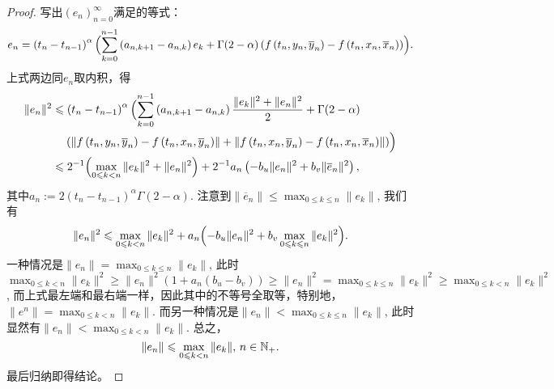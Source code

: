 \begin{proof}
    写出$\left(e_n\right)_{n=0}^\infty$满足的等式：
    \begin{equation*}
        e_n=\left(t_n-t_{n-1}\right)^\alpha\Bigl(\sum_{k=0}^{n-1}\left(a_{n,k+1}-a_{n,k}\right)e_k+\Gamma(2-\alpha)\left(f\left(t_n,y_n,\overline y_n\right)-f\left(t_n,x_n,\overline x_n\right)\right)\Bigr).
    \end{equation*}
    上式两边同$e_n$取内积，得
    \begin{align*}
        \|e_n\|^2&\leqslant\left(t_n-t_{n-1}\right)^\alpha\Bigl(\sum_{k=0}^{n-1}\left(a_{n,k+1}-a_{n,k}\right)\frac{\|e_k\|^2+\|e_n\|^2}{2} +\Gamma(2-\alpha)
        \\& \relphantom{=}\left(\left\|f\left(t_n,y_n,\overline y_n\right)-f\left(t_n,x_n,\overline y_n\right)\right\|+\left\|f\left(t_n,x_n,\overline y_n\right)-f\left(t_n,x_n,\overline x_n\right)\right\|\right)\Bigr)
        \\&\leqslant 2^{-1}\Bigl(\max_{0\leqslant k<n} \|e_k\|^2 + \|e_n\|^2\Bigr)
        +2^{-1}a_n\left(-b_u \|e_n\|^2+b_v \|\overline e_n\|^2\right),
    \end{align*}
    其中$a_n:=2\left(t_n-t_{n-1}\right)^\alpha\Gamma(2-\alpha)$. 注意到$\|\overline e_n\|\leqslant \max_{0\leqslant k\leqslant n} \|e_k\|$, 我们有
    \begin{equation*}
        \|e_n\|^2\leqslant \max_{0\leqslant k<n} \|e_k\|^2+a_n\Bigl(-b_u \|e_n\|^2+b_v \max_{0\leqslant k\leqslant n} \|e_k\|^2\Bigr).
    \end{equation*}
    一种情况是$\|e_n\|=\max_{0\leqslant k\leqslant n} \|e_k\|$, 此时
    $\max_{0\leqslant k<n} \|e_k\|^2 \geqslant \|e_n\|^2 (1+ a_n(b_u-b_v))\geqslant \|e_n\|^2=\max_{0\leqslant k\leqslant n} \|e_k\|^2\geqslant \max_{0\leqslant k<n} \|e_k\|^2$, 而上式最左端和最右端一样，因此其中的不等号全取等，特别地，$\|e^n\|=\max_{0\leqslant k<n} \|e_k\|$. 而另一种情况是$\|e_n\|<\max_{0\leqslant k\leqslant n} \|e_k\|$, 此时显然有$\|e_n\|<\max_{0\leqslant k< n} \|e_k\|$. 总之，
    \begin{equation*}
        \|e_n\|\leqslant\max_{0\leqslant k< n} \|e_k\|,\,n\in\mathbb{N_+}.
    \end{equation*}
    最后归纳即得结论。
\end{proof}